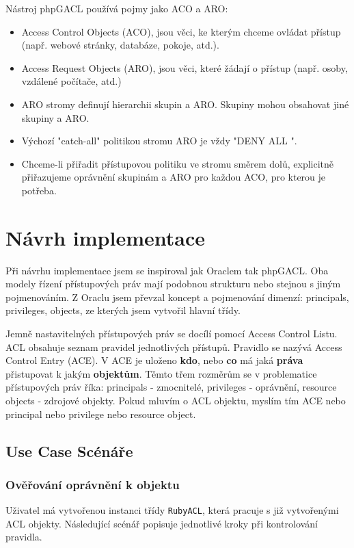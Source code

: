 Nástroj phpGACL používá pojmy jako ACO a ARO:
\begin{itemize}
\item Access Control Objects (ACO), jsou věci, ke kterým chceme ovládat přístup (např. webové stránky, databáze, pokoje, atd.).
\item Access Request Objects (ARO), jsou věci, které žádají o přístup (např. osoby, vzdálené počítače, atd.)
\item ARO stromy definují hierarchii skupin a ARO. Skupiny mohou obsahovat jiné skupiny a ARO.
\item Výchozí "catch-all" politikou stromu ARO je vždy "DENY ALL ".
\item Chceme-li přiřadit přístupovou politiku ve stromu směrem dolů, explicitně přiřazujeme oprávnění skupinám a ARO pro každou ACO, pro kterou je potřeba.
\end{itemize}


\section{Návrh implementace}
Při návrhu implementace jsem se inspiroval jak Oraclem tak phpGACL. Oba modely řízení přístupových práv mají podobnou strukturu nebo stejnou s jiným pojmenováním. Z Oraclu jsem převzal koncept a pojmenování dimenzí: principals, privileges, objects, ze kterých jsem vytvořil hlavní třídy. 

Jemně nastavitelných přístupových práv se docílí pomocí Access Control Listu. ACL obsahuje seznam pravidel jednotlivých přístupů. Pravidlo se nazývá Access Control Entry (ACE). V ACE je uloženo \textbf{kdo}, nebo \textbf{co} má jaká \textbf{práva} přistupovat k jakým \textbf{objektům}. Těmto třem rozměrům se v problematice přístupových práv říka: principals - zmocnitelé, privileges - oprávnění, resource objects - zdrojové objekty. Pokud mluvím o ACL objektu, myslím tím ACE nebo principal nebo privilege nebo resource object.


\subsection{Use Case Scénáře}

\subsubsection{Ověřování oprávnění k objektu}
Uživatel má vytvořenou instanci třídy \verb|RubyACL|, která pracuje s již vytvořenými ACL objekty. Následující scénář popisuje jednotlivé kroky při kontrolování pravidla.


